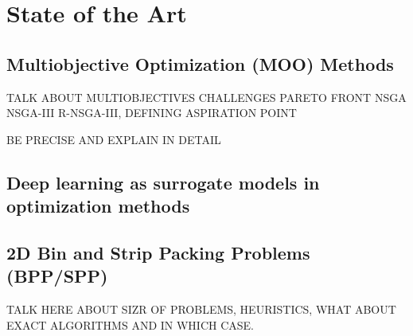\section{State of the Art}

\subsection*{Multiobjective Optimization (MOO) Methods}

TALK ABOUT MULTIOBJECTIVES CHALLENGES
PARETO FRONT
NSGA
NSGA-III
R-NSGA-III, DEFINING ASPIRATION POINT

BE PRECISE AND EXPLAIN IN DETAIL

\subsection*{Deep learning as surrogate models in optimization methods}

\subsection*{2D Bin and Strip Packing Problems (BPP/SPP)}

TALK HERE ABOUT SIZR OF PROBLEMS, HEURISTICS, WHAT ABOUT EXACT ALGORITHMS AND IN WHICH CASE.